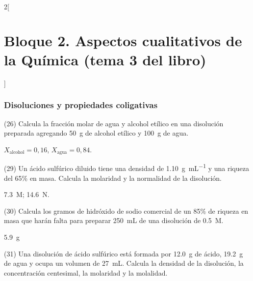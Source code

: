\documentclass[10pt]{article}
\begin{document}
\begin{multicols}{2}[
    \section{Bloque 2. Aspectos cualitativos de la Química (tema 3 del libro)}
  ]
\subsubsection{Disoluciones y propiedades coligativas}

\begin{exercise}[
    tags    = {},
    topics  = {química,química básica},
    source  = {FQ 1B MGH 2016, p85, e26},
  ]
  (26) Calcula la fracción molar de agua y alcohol etílico en una
  disolución preparada agregando \SI{50}{\gram} de alcohol etílico y \SI{100}{\gram} de agua.
\end{exercise}

\begin{solution}
  \( X_\textrm{alcohol} = 0,16 \), \( X_\textrm{agua} = 0,84 \).
\end{solution}




\begin{exercise}[
    tags    = {},
    topics  = {química,química básica},
    source  = {FQ 1B MGH 2016, p85, e29},
  ]
  (29) Un ácido sulfúrico diluido tiene una densidad de \SI{1.10}{\gram\per\milli\liter} y una riqueza del 65\% en masa. Calcula la molaridad y la normalidad de la disolución.
\end{exercise}

\begin{solution}
  \SI{7.3}{M}; \SI{14.6}{N}.
\end{solution}




\begin{exercise}[
    tags    = {},
    topics  = {química,química básica},
    source  = {FQ 1B MGH 2016, p85, e30},
  ]
  (30) Calcula los gramos de hidróxido de sodio comercial de un
  85\% de riqueza en masa que harán falta para preparar \SI{250}{\milli\liter} de una disolución de  \SI{0.5}{M}.
\end{exercise}

\begin{solution}
\SI{5.9}{\gram}
\end{solution}




\begin{exercise}[
    tags    = {},
    topics  = {química,química básica},
    source  = {FQ 1B MGH 2016, p85, e31},
  ]
  (31) Una disolución de ácido sulfúrico está formada por \SI{12.0}{\gram} de
  ácido, \SI{19.2}{\gram} de agua y ocupa un volumen de \SI{27}{\milli\liter}. Calcula la densidad de la disolución, la concentración centesimal, la molaridad y la molalidad.
\end{exercise}


\end{multicols}
\end{document}
